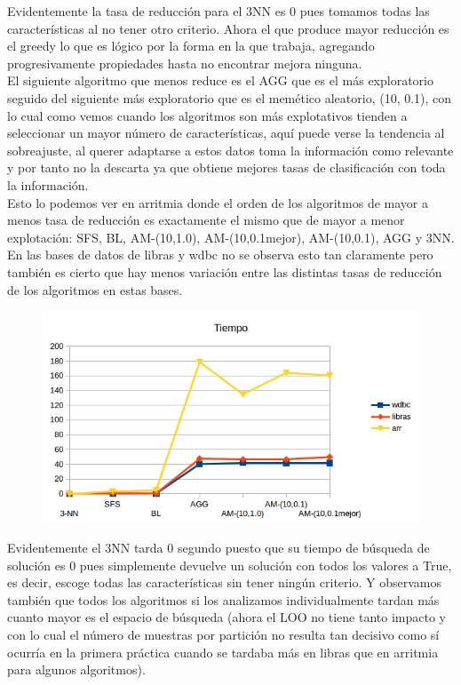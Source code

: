 \documentclass[10pt,a4paper]{article}
\begin{document}
Evidentemente la tasa de reducción para el 3NN es 0 pues tomamos todas las características al no tener otro criterio. Ahora el que produce mayor reducción es el greedy lo que es lógico por la forma en la que trabaja, agregando progresivamente propiedades hasta no encontrar mejora ninguna.\\

El siguiente algoritmo que menos reduce es el AGG que es el más exploratorio seguido del siguiente más exploratorio que es el memético aleatorio, (10, 0.1), con lo cual como vemos cuando los algoritmos son más explotativos tienden a seleccionar un mayor número de características, aquí puede verse la tendencia al sobreajuste, al querer adaptarse a estos datos toma la información como relevante y por tanto no la descarta ya que obtiene mejores tasas de clasificación con toda la información.\\

Esto lo podemos ver en arritmia donde el orden de los algoritmos de mayor a menos tasa de reducción es exactamente el mismo que de mayor a menor explotación: SFS, BL, AM-(10,1.0), AM-(10,0.1mejor), AM-(10,0.1), AGG y 3NN.\\

En las bases de datos de libras y wdbc no se observa esto tan claramente pero también es cierto que hay menos variación entre las distintas tasas de reducción de los algoritmos en estas bases.\\

\begin{figure}[H]
\centering
\includegraphics[width=130mm]{tiempo_am.png}
\end{figure}


Evidentemente el 3NN tarda 0 segundo puesto que su tiempo de búsqueda de solución es 0 pues simplemente devuelve un solución con todos los valores a True, es decir, escoge todas las características sin tener ningún criterio. Y observamos también que todos los algoritmos si los analizamos individualmente tardan más cuanto mayor es el espacio de búsqueda (ahora el LOO no tiene tanto impacto y con lo cual el número de muestras por partición no resulta tan decisivo como sí ocurría en la primera práctica cuando se tardaba más en libras que en arritmia para algunos algoritmos).\\
\end{document}
